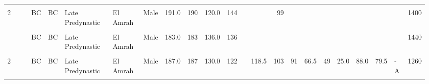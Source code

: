 \begin{table}[p]
{\begin{tabular}{rrrlllllrrrrrrrrrrrrrlr}
\cellcolor{gray!10}{2} & \cellcolor{gray!10}{} & \cellcolor{gray!10}{} & \cellcolor{gray!10}{BC} & \cellcolor{gray!10}{BC} & \cellcolor{gray!10}{Late Predynastic} & \cellcolor{gray!10}{El Amrah} & \cellcolor{gray!10}{Male} & \cellcolor{gray!10}{173.0} & \cellcolor{gray!10}{173} & \cellcolor{gray!10}{125.0} & \cellcolor{gray!10}{133} & \cellcolor{gray!10}{111} & \cellcolor{gray!10}{119.0} & \cellcolor{gray!10}{95} & \cellcolor{gray!10}{94} & \cellcolor{gray!10}{70.0} & \cellcolor{gray!10}{46} & \cellcolor{gray!10}{24.0} & \cellcolor{gray!10}{99.0} & \cellcolor{gray!10}{69.0} & \cellcolor{gray!10}{C} & \cellcolor{gray!10}{1220}\\
2 &  &  & BC & BC & Late Predynastic & El Amrah & Male & 191.0 & 190 & 120.0 & 144 &  &  & 99 &  &  &  &  &  &  &  & 1400\\
\cellcolor{gray!10}{2} & \cellcolor{gray!10}{} & \cellcolor{gray!10}{} & \cellcolor{gray!10}{BC} & \cellcolor{gray!10}{BC} & \cellcolor{gray!10}{Late Predynastic} & \cellcolor{gray!10}{El Amrah} & \cellcolor{gray!10}{Male} & \cellcolor{gray!10}{196.0} & \cellcolor{gray!10}{195} & \cellcolor{gray!10}{} & \cellcolor{gray!10}{132} & \cellcolor{gray!10}{} & \cellcolor{gray!10}{} & \cellcolor{gray!10}{} & \cellcolor{gray!10}{} & \cellcolor{gray!10}{} & \cellcolor{gray!10}{} & \cellcolor{gray!10}{} & \cellcolor{gray!10}{} & \cellcolor{gray!10}{} & \cellcolor{gray!10}{} & \cellcolor{gray!10}{}\\
\addlinespace
2 &  &  & BC & BC & Late Predynastic & El Amrah & Male & 183.0 & 183 & 136.0 & 136 &  &  &  &  &  &  &  &  &  &  & 1440\\
\cellcolor{gray!10}{2} & \cellcolor{gray!10}{} & \cellcolor{gray!10}{} & \cellcolor{gray!10}{BC} & \cellcolor{gray!10}{BC} & \cellcolor{gray!10}{Late Predynastic} & \cellcolor{gray!10}{El Amrah} & \cellcolor{gray!10}{Male} & \cellcolor{gray!10}{185.0} & \cellcolor{gray!10}{182} & \cellcolor{gray!10}{131.0} & \cellcolor{gray!10}{131} & \cellcolor{gray!10}{} & \cellcolor{gray!10}{127.0} & \cellcolor{gray!10}{104} & \cellcolor{gray!10}{98} & \cellcolor{gray!10}{67.0} & \cellcolor{gray!10}{} & \cellcolor{gray!10}{} & \cellcolor{gray!10}{94.0} & \cellcolor{gray!10}{75.0} & \cellcolor{gray!10}{B} & \cellcolor{gray!10}{1350}\\
2 &  &  & BC & BC & Late Predynastic & El Amrah & Male & 187.0 & 187 & 130.0 & 122 &  & 118.5 & 103 & 91 & 66.5 & 49 & 25.0 & 88.0 & 79.5 & - A & 1260\\
\cellcolor{gray!10}{2} & \cellcolor{gray!10}{} & \cellcolor{gray!10}{} & \cellcolor{gray!10}{BC} & \cellcolor{gray!10}{BC} & \cellcolor{gray!10}{Late Predynastic} & \cellcolor{gray!10}{El Amrah} & \cellcolor{gray!10}{Male} & \cellcolor{gray!10}{194.5} & \cellcolor{gray!10}{192} & \cellcolor{gray!10}{133.0} & \cellcolor{gray!10}{132} & \cellcolor{gray!10}{} & \cellcolor{gray!10}{124.0} & \cellcolor{gray!10}{104} & \cellcolor{gray!10}{104} & \cellcolor{gray!10}{74.0} & \cellcolor{gray!10}{48} & \cellcolor{gray!10}{23.5} & \cellcolor{gray!10}{100.0} & \cellcolor{gray!10}{69.0} & \cellcolor{gray!10}{C} & \cellcolor{gray!10}{1450}\\

\end{tabular}}
\end{table}
